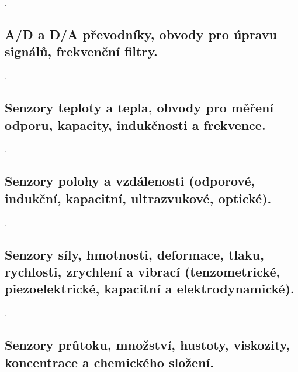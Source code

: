 \newpage . \newpage
\subsection{A/D a D/A převodníky, obvody pro úpravu signálů, frekvenční filtry.}

\newpage . \newpage
\subsection{Senzory teploty a tepla, obvody pro měření odporu, kapacity, indukčnosti a frekvence.}

\newpage . \newpage
\subsection{Senzory polohy a vzdálenosti (odporové, indukční, kapacitní, ultrazvukové, optické).}

\newpage . \newpage
\subsection{Senzory síly, hmotnosti, deformace, tlaku, rychlosti, zrychlení a vibrací (tenzometrické, piezoelektrické, kapacitní a elektrodynamické).}

\newpage . \newpage
\subsection{Senzory průtoku, množství, hustoty, viskozity, koncentrace a chemického složení.}
